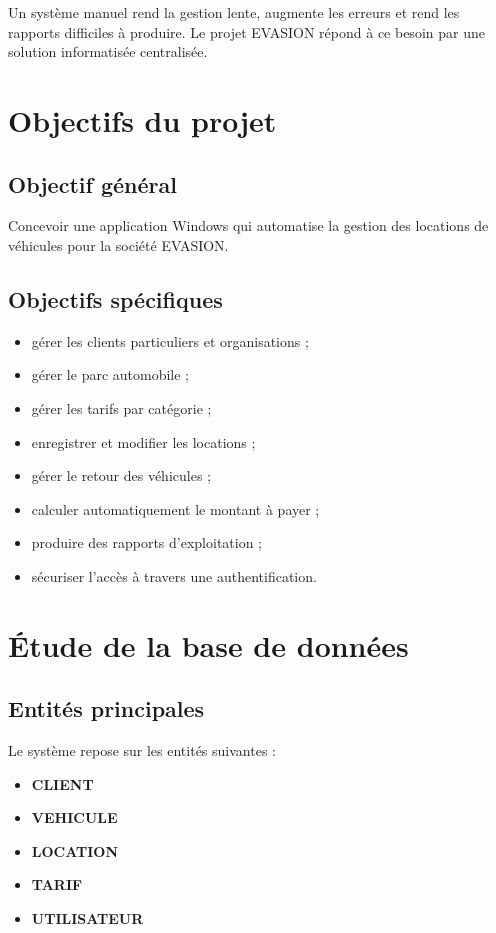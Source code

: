 \documentclass[12pt,a4paper]{report}
\begin{document}
Un système manuel rend la gestion lente, augmente les erreurs et rend les rapports difficiles à produire. Le projet EVASION répond à ce besoin par une solution informatisée centralisée.

\chapter{Objectifs du projet}
\section{Objectif général}
Concevoir une application Windows qui automatise la gestion des locations de véhicules pour la société EVASION.

\section{Objectifs spécifiques}
\begin{itemize}[leftmargin=1.2cm]
    \item gérer les clients particuliers et organisations ;
    \item gérer le parc automobile ;
    \item gérer les tarifs par catégorie ;
    \item enregistrer et modifier les locations ;
    \item gérer le retour des véhicules ;
    \item calculer automatiquement le montant à payer ;
    \item produire des rapports d'exploitation ;
    \item sécuriser l'accès à travers une authentification.
\end{itemize}

\chapter{Étude de la base de données}
\section{Entités principales}
Le système repose sur les entités suivantes :
\begin{itemize}[leftmargin=1.2cm]
    \item \textbf{CLIENT}
    \item \textbf{VEHICULE}
    \item \textbf{LOCATION}
    \item \textbf{TARIF}
    \item \textbf{UTILISATEUR}
\end{itemize}
\end{document}
